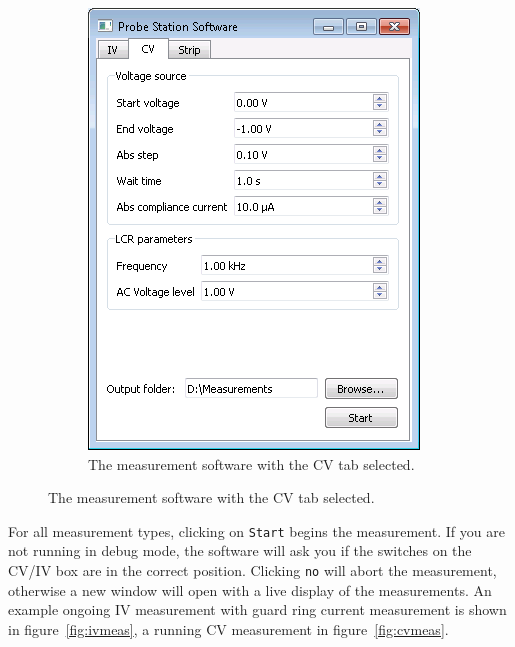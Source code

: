 \documentclass[a4paper]{article}
\begin{document}
\begin{figure}[hbtp]
\begin{subfigure}[t]{0.475\textwidth}
\centering\captionsetup{width=.8\linewidth}%
\includegraphics[width=\linewidth]{pictures/softcv.png}
\caption[Software with the CV Tab]{The measurement software with the CV tab selected.}
\label{fig:softwareopencv}
\end{subfigure}
\end{figure}

For all measurement types, clicking on {\tt Start} begins the measurement.
If you are not running in debug mode, the software will ask you if the switches on the CV/IV box are in the correct position.
Clicking {\tt no} will abort the measurement, otherwise a new window will open with a live display of the measurements.
An example ongoing IV measurement with guard ring current measurement is shown in figure~\ref{fig:ivmeas}, a running CV measurement in figure~\ref{fig:cvmeas}.\\
\end{document}

